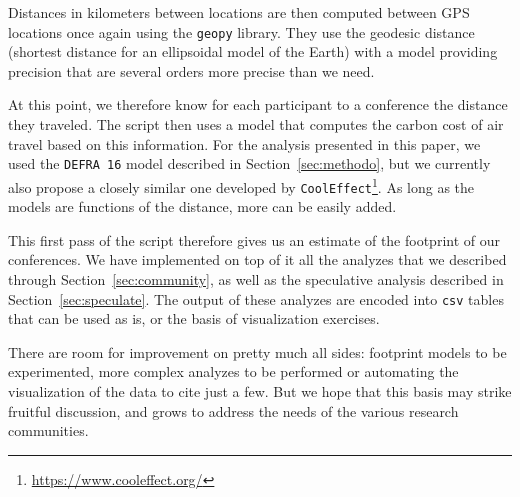 Distances in kilometers between locations are then computed between GPS locations
once again using the \texttt{geopy} library. They use the geodesic distance
(shortest distance for an ellipsoidal model of the Earth) with a model providing
precision that are several orders more precise than we need.

At this point, we therefore know for each participant to a conference the
distance they traveled. The script then uses a model that computes the carbon
cost of air travel based on this information. For the analysis presented in this
paper, we used the \texttt{DEFRA 16} model described in
Section~\ref{sec:methodo}, but we currently also propose a closely similar one
developed by \texttt{CoolEffect}\footnote{\url{https://www.cooleffect.org/}}.
As long as the models are functions of the distance, more can be easily added.

This first pass of the script therefore gives us an estimate of the footprint of
our conferences. We have implemented on top of it all the analyzes that we
described through Section~\ref{sec:community}, as well as the speculative
analysis described in Section~\ref{sec:speculate}. The output of these analyzes
are encoded into \texttt{csv} tables that can be used as is, or the basis of
visualization exercises.

There are room for improvement on pretty much all sides: footprint models to be
experimented, more complex analyzes to be performed or automating the visualization
of the data to cite just a few. But we hope that this basis may strike fruitful
discussion, and grows to address the needs of the various research communities.


